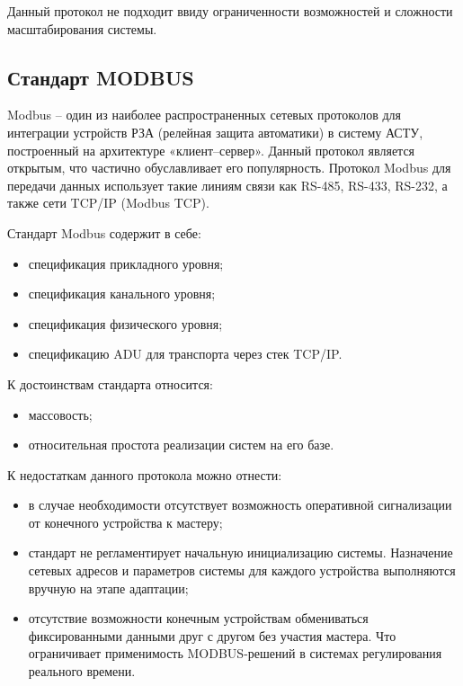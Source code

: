 Данный протокол не подходит ввиду ограниченности возможностей и сложности масштабирования системы.

\subsection{Стандарт MODBUS}

Modbus – один из наиболее распространенных сетевых протоколов для интеграции устройств РЗА (релейная защита автоматики) в систему АСТУ, построенный на архитектуре «клиент–сервер». Данный протокол является открытым, что частично обуславливает его популярность. Протокол Modbus для передачи данных использует такие линиям связи как RS-485, RS-433, RS-232, а также сети TCP/IP (Modbus TCP).

Стандарт Modbus содержит в себе:

\begin{itemize}
 \item спецификация прикладного уровня;
 \item спецификация канального уровня;
 \item спецификация физического уровня;
 \item спецификацию ADU для транспорта через стек TCP/IP.
\end{itemize}

К достоинствам стандарта относится:

\begin{itemize}
 \item массовость;
 \item относительная простота реализации систем на его базе.
\end{itemize}

К недостаткам данного протокола можно отнести:

\begin{itemize}
 \item в случае необходимости отсутствует возможность оперативной сигнализации от конечного устройства к мастеру;
 \item стандарт не регламентирует начальную инициализацию системы. Назначение сетевых адресов и параметров системы для каждого устройства выполняются вручную на этапе адаптации;
 \item отсутствие  возможности  конечным  устройствам  обмениваться фиксированными данными друг с другом без участия мастера. Что ограничивает  применимость MODBUS-решений в системах регулирования реального времени.
\end{itemize}

